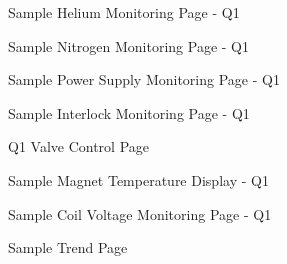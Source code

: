 \begin{center}

\begin{figure}
\caption{Sample Helium Monitoring Page - Q1\label{fig:he_page}}
\end{figure}

\begin{figure}
\caption{Sample Nitrogen Monitoring Page - Q1\label{fig:nit_page}}
\end{figure}

\begin{figure}
\caption{Sample Power Supply Monitoring Page - Q1\label{fig:ps_page}}
\end{figure}

\begin{figure}
\caption{Sample Interlock Monitoring Page - Q1\label{fig:is_page}}
\end{figure}

\begin{figure}
\caption{Q1 Valve Control Page\label{fig:q1_valve_page}}
\end{figure}



\begin{figure}
\caption{Sample Magnet Temperature Display - Q1\label{fig:temp_page}}
\end{figure}

\begin{figure}
\caption{Sample Coil Voltage Monitoring Page - Q1\label{fig:coil_page}}
\end{figure}

\begin{figure}
\caption{Sample Trend Page\label{fig:trend_page}}
\end{figure}

\end{center}

